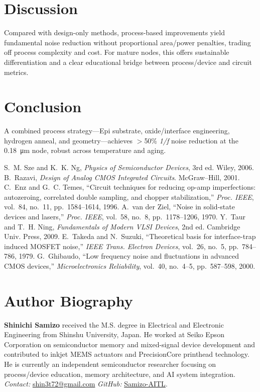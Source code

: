 \documentclass[conference]{IEEEtran}
\begin{document}
\section{Discussion}
Compared with design-only methods, process-based improvements yield fundamental noise reduction without proportional area/power penalties, trading off process complexity and cost. For mature nodes, this offers sustainable differentiation and a clear educational bridge between process/device and circuit metrics.

\section{Conclusion}
A combined process strategy---Epi substrate, oxide/interface engineering, hydrogen anneal, and geometry---achieves $>$50\% \emph{1/f} noise reduction at the \SI{0.18}{\micro\meter} node, robust across temperature and aging.

\begin{thebibliography}{10}
S.~M. Sze and K.~K. Ng, \emph{Physics of Semiconductor Devices}, 3rd ed. Wiley, 2006.
B.~Razavi, \emph{Design of Analog CMOS Integrated Circuits}. McGraw--Hill, 2001.
C.~Enz and G.~C. Temes, ``Circuit techniques for reducing op-amp imperfections: autozeroing, correlated double sampling, and chopper stabilization,'' \emph{Proc. IEEE}, vol.~84, no.~11, pp.~1584--1614, 1996.
A.~van der Ziel, ``Noise in solid-state devices and lasers,'' \emph{Proc. IEEE}, vol.~58, no.~8, pp.~1178--1206, 1970.
Y.~Taur and T.~H. Ning, \emph{Fundamentals of Modern VLSI Devices}, 2nd ed. Cambridge Univ. Press, 2009.
E.~Takeda and N.~Suzuki, ``Theoretical basis for interface-trap induced MOSFET noise,'' \emph{IEEE Trans. Electron Devices}, vol.~26, no.~5, pp.~784--786, 1979.
G.~Ghibaudo, ``Low frequency noise and fluctuations in advanced CMOS devices,'' \emph{Microelectronics Reliability}, vol.~40, no.~4--5, pp.~587--598, 2000.
\end{thebibliography}

\section*{Author Biography}
\textbf{Shinichi Samizo} received the M.S. degree in Electrical and Electronic Engineering from Shinshu University, Japan. He worked at Seiko Epson Corporation on semiconductor memory and mixed-signal device development and contributed to inkjet MEMS actuators and PrecisionCore printhead technology. He is currently an independent semiconductor researcher focusing on process/device education, memory architecture, and AI system integration.\\[2pt]
\emph{Contact:} \href{mailto:shin3t72@gmail.com}{shin3t72@gmail.com}\quad
\emph{GitHub:} \href{https://github.com/Samizo-AITL}{Samizo-AITL}.
\end{document}
